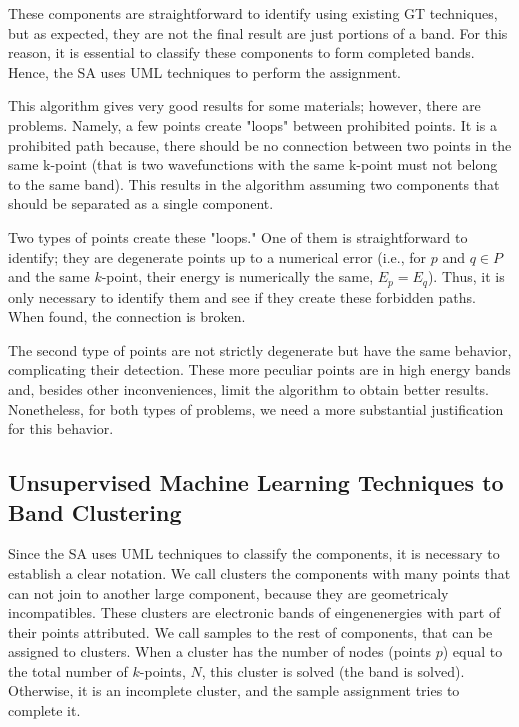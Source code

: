 \documentclass[a4paper,12pt]{report}
\begin{document}
\begin{appendices}
These components are straightforward to identify using existing GT techniques, but as expected, they are not the final result are just portions of a band.
For this reason, it is essential to classify these components to form completed bands.
Hence, the SA uses UML techniques to perform the assignment.

This algorithm gives very good results for some materials; however, there are problems.
Namely, a few points create "loops" between prohibited points.
It is a prohibited path because, there should be no connection between two points in the same k-point (that is two wavefunctions with the same k-point must not belong to the same band).
This results in the algorithm assuming two components that should be separated as a single component.


Two types of points create these "loops."
One of them is straightforward to identify; they are degenerate points up to a numerical error
(i.e., for $p$ and $q \in P$ and the same $k$-point, their energy is numerically the same, $E_p=E_q$).
Thus, it is only necessary to identify them and see if they create these forbidden paths.
When found, the connection is broken.

The second type of points are not strictly degenerate but have the same behavior, complicating their detection.
These more peculiar points are in high energy bands and, besides other inconveniences, limit the algorithm to obtain better results.
Nonetheless, for both types of problems, we need a more substantial justification for this behavior.




\subsection{Unsupervised Machine Learning Techniques to Band Clustering}

Since the SA uses UML techniques to classify the components, it is necessary to establish a clear notation.
We call clusters the components with many points that can not join to another large component, because they are geometricaly incompatibles.
These clusters are electronic bands of eingenenergies with part of their points attributed.
We call samples to the rest of components, that can be assigned to clusters.
When a cluster has the number of nodes (points $p$) equal to the total number of $k$-points, $N$, this cluster is solved (the band is solved). Otherwise, it is an incomplete cluster, and the sample assignment tries to complete it.


\end{appendices}
\end{document}
